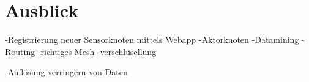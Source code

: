 \section{Ausblick}
-Registrierung neuer Sensorknoten mittels Webapp
-Aktorknoten
-Datamining
-Routing
-richtiges Mesh
-verschlüsellung

-Auflösung verringern von Daten